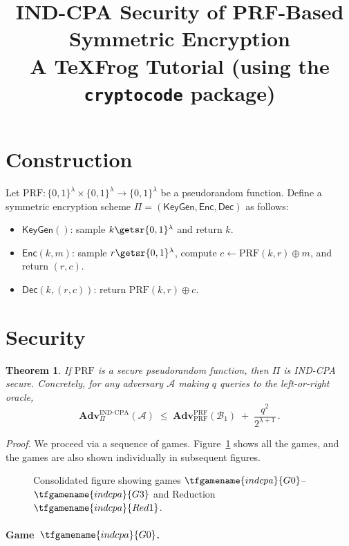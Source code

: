 \documentclass{article}
\title{IND-CPA Security of PRF-Based Symmetric Encryption\\
{\large A TeXFrog Tutorial (using the \texttt{cryptocode} package)}}
\author{}
\date{}
\newtheorem{theorem}{Theorem}
\begin{document}
\maketitle

\section{Construction}

Let $\mathrm{PRF}\colon \{0,1\}^\lambda \times \{0,1\}^\lambda \to \{0,1\}^\lambda$
be a pseudorandom function.
Define a symmetric encryption scheme $\Pi = (\mathsf{KeyGen}, \mathsf{Enc}, \mathsf{Dec})$ as follows:
\begin{itemize}
  \item $\mathsf{KeyGen}()$: sample $k \getsr \{0,1\}^\lambda$ and return $k$.
  \item $\mathsf{Enc}(k, m)$: sample $r \getsr \{0,1\}^\lambda$, compute
    $c \gets \mathrm{PRF}(k, r) \oplus m$, and return $(r, c)$.
  \item $\mathsf{Dec}(k, (r, c))$: return $\mathrm{PRF}(k, r) \oplus c$.
\end{itemize}

\section{Security}

\begin{theorem}
If\/ $\mathrm{PRF}$ is a secure pseudorandom function, then $\Pi$ is IND-CPA secure.
Concretely, for any adversary $\mathcal{A}$ making $q$ queries to the
left-or-right oracle,
\[
  \mathbf{Adv}^{\mathrm{IND\text{-}CPA}}_\Pi(\mathcal{A})
  \;\leq\;
  \mathbf{Adv}^{\mathrm{PRF}}_{\mathrm{PRF}}(\mathcal{B}_1)
  \;+\; \frac{q^2}{2^{\lambda+1}} \,.
\]
\end{theorem}

\noindent\textit{Proof.}\quad
We proceed via a sequence of games. Figure~\ref{fig:all-games} shows all the games, and the games are also shown individually in subsequent figures.

\begin{figure}[ht]
\centering
{}
\caption{Consolidated figure showing games $\tfgamename{indcpa}{G0}$--$\tfgamename{indcpa}{G3}$ and Reduction $\tfgamename{indcpa}{Red1}$.}
\label{fig:all-games}
\end{figure}

\paragraph{Game~$\tfgamename{indcpa}{G0}$.}

\end{document}
